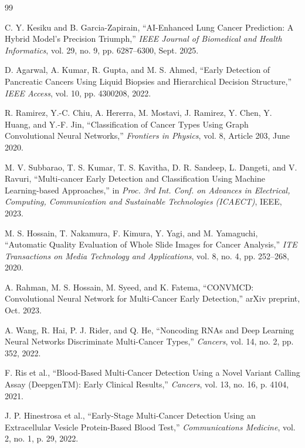 \documentclass[a4paper,12pt]{report}
\begin{document}
\renewcommand{\bibname}{References}
\vspace{0.5cm}
\fontsize{12pt}{18pt}\selectfont
\begin{thebibliography}{99}

C. Y. Kesiku and B. Garcia-Zapirain, ``AI-Enhanced Lung Cancer Prediction: A Hybrid Model’s Precision Triumph,'' \textit{IEEE Journal of Biomedical and Health Informatics}, vol. 29, no. 9, pp. 6287--6300, Sept. 2025.

D. Agarwal, A. Kumar, R. Gupta, and M. S. Ahmed, ``Early Detection of Pancreatic Cancers Using Liquid Biopsies and Hierarchical Decision Structure,'' \textit{IEEE Access}, vol. 10, pp. 4300208, 2022.

R. Ramirez, Y.-C. Chiu, A. Hererra, M. Mostavi, J. Ramirez, Y. Chen, Y. Huang, and Y.-F. Jin, ``Classification of Cancer Types Using Graph Convolutional Neural Networks,'' \textit{Frontiers in Physics}, vol. 8, Article 203, June 2020.

M. V. Subbarao, T. S. Kumar, T. S. Kavitha, D. R. Sandeep, L. Dangeti, and V. Ravuri, ``Multi-cancer Early Detection and Classification Using Machine Learning-based Approaches,'' in \textit{Proc. 3rd Int. Conf. on Advances in Electrical, Computing, Communication and Sustainable Technologies (ICAECT)}, IEEE, 2023.

M. S. Hossain, T. Nakamura, F. Kimura, Y. Yagi, and M. Yamaguchi, ``Automatic Quality Evaluation of Whole Slide Images for Cancer Analysis,'' \textit{ITE Transactions on Media Technology and Applications}, vol. 8, no. 4, pp. 252--268, 2020.

A. Rahman, M. S. Hossain, M. Syeed, and K. Fatema, ``CONVMCD: Convolutional Neural Network for Multi-Cancer Early Detection,'' arXiv preprint, Oct. 2023.

A. Wang, R. Hai, P. J. Rider, and Q. He, ``Noncoding RNAs and Deep Learning Neural Networks Discriminate Multi-Cancer Types,'' \textit{Cancers}, vol. 14, no. 2, pp. 352, 2022.

F. Ris et al., ``Blood-Based Multi-Cancer Detection Using a Novel Variant Calling Assay (DeepgenTM): Early Clinical Results,'' \textit{Cancers}, vol. 13, no. 16, p. 4104, 2021.

J. P. Hinestrosa et al., ``Early-Stage Multi-Cancer Detection Using an Extracellular Vesicle Protein-Based Blood Test,'' \textit{Communications Medicine}, vol. 2, no. 1, p. 29, 2022.


\end{thebibliography}
\end{document}
